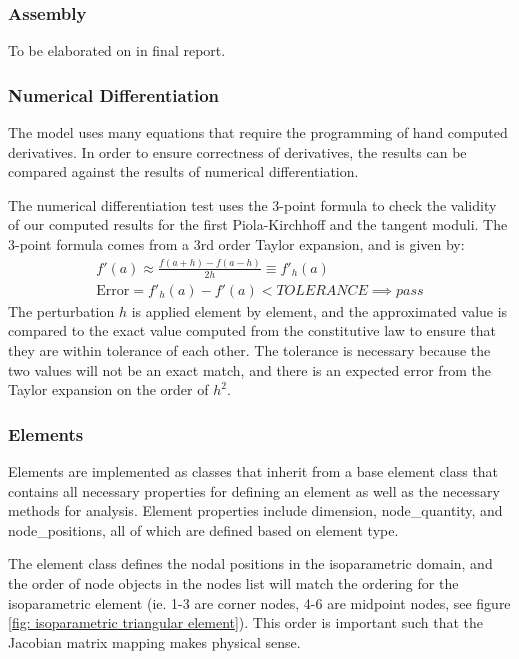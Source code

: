 \documentclass[]{spie}  %
\begin{document}
\subsubsection{Assembly}
To be elaborated on in final report. 

\subsubsection{Numerical Differentiation}
The model uses many equations that require the programming of hand computed derivatives. In order to ensure correctness of derivatives, the results can be compared against the results of numerical differentiation.

The numerical differentiation test uses the 3-point formula to check the validity of our computed results for the first Piola-Kirchhoff and the tangent moduli. The 3-point formula comes from a 3rd order Taylor expansion, and is given by:
\begin{gather}
\label{eq: 3 point formula}
f'(a) \approx \frac{f(a + h) - f(a - h)}{2h} \equiv f'_h(a) \\[1ex]
\textrm{Error} = f'_h(a) - f'(a) < TOLERANCE \implies pass
\end{gather}
The perturbation $h$ is applied element by element, and the approximated value is compared to the exact value computed from the constitutive law to ensure that they are within tolerance of each other. The tolerance is necessary because the two values will not be an exact match, and there is an expected error from the Taylor expansion on the order of $h^2$. 

\subsubsection{Elements}
Elements are implemented as classes that inherit from a base element class that contains all necessary properties for defining an element as well as the necessary methods for analysis. Element properties include dimension, node\_quantity, and node\_positions, all of which are defined based on element type. 

The element class defines the nodal positions in the isoparametric domain, and the order of node objects in the nodes list will match the ordering for the isoparametric element (ie. 1-3 are corner nodes, 4-6 are midpoint nodes, see figure \ref{fig: isoparametric triangular element}). This order is important such that the Jacobian matrix mapping makes physical sense. 
\end{document}

